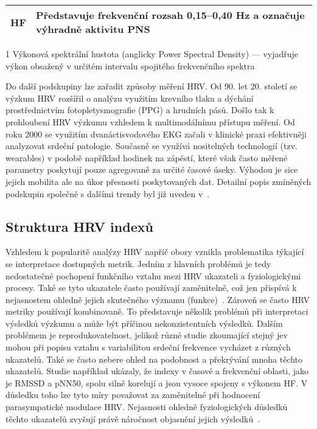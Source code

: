 \begin{table}[h!]
\begin{threeparttable}
\begin{tabular}{p{2cm}p{12cm}}
            HF       & Představuje frekvenční rozsah 0,15--0,40 Hz a označuje výhradně aktivitu \gls{PNS}                                                                           \\ \bottomrule
        \end{tabular}
        \begin{tablenotes}
            \item [1] Výkonová spektrální hustota (anglicky Power Spectral
            Density) --- vyjadřuje výkon obsažený v určitém intervalu spojitého
            frekvenčního spektra
        \end{tablenotes}
    \end{threeparttable}
\end{table}

Do další podskupiny lze zařadit způsoby měření \gls{HRV}. Od 90. let 20. století
se výzkum \gls{HRV} rozšířil o analýzu využitím krevního tlaku a dýchání
prostřednictvím fotopletysmografie (\gls{PPG}) a hrudních pásů. Došlo tak k
prohloubení HRV výzkumu vzhledem k multimodálnímu přístupu měření. Od roku 2000
se využitím dvanáctisvodového EKG začali v klinické praxi efektivněji analyzovat
srdeční patologie. Současně se využívá nositelných technologií (tzv. wearables)
v podobě například hodinek na zápěstí, které však často měřené parametry
poskytují pouze agregovaně za určité časové úseky. Výhodou je sice jejich
mobilita ale na úkor přesnosti poskytovaných dat. Detailní popis zmíněných
podskupin společně s dalšími trendy byl již uveden v~\cite{Ishaque2021}.

\subsection{Struktura HRV indexů}
\label{subsec:hrv_indices}
Vzhledem k popularitě analýzy \gls{HRV} napříč obory vznikla problematika
týkající se interpretace dostupných metrik. Jedním z hlavních problémů je tedy
nedostatečné pochopení funkčního vztahu mezi \gls{HRV} ukazateli a
fyziologickými procesy. Také se tyto ukazatele často používají zaměnitelně, což
jen přispívá k nejasnostem ohledně jejich skutečného významu
(funkce)~\cite{Fatisson2016,hayano2019}. Zároveň se často \gls{HRV} metriky
používají kombinovaně. To představuje několik problémů při interpretaci výsledků
výzkumu a může být příčinou nekonzistentních výsledků. Dalším problémem je
reprodukovatelnost, jelikož různé studie zkoumající stejný jev mohou při popisu
vztahu s variabilitou srdeční frekvence vycházet z různých ukazatelů. Také se
často nebere ohled na podobnost a překrývání mnoha těchto ukazatelů. Studie
například ukázaly, že indexy v časové a frekvenční oblasti, jako je RMSSD a
pNN50, spolu silně korelují a jsou vysoce spojeny s výkonem HF. V důsledku toho
lze tyto míry považovat za zaměnitelné při hodnocení parasympatické modulace
\gls{HRV}. Nejasnosti ohledně fyziologických důsledků těchto ukazatelů zvyšují
právě náročnost objasnění jejich
výsledků~\cite{Bigger1989,Rohila2020,Malik1996,Ishaque2021}.

